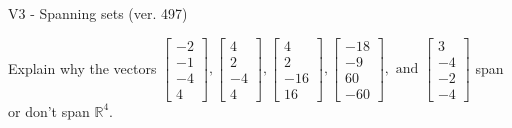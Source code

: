 \begin{exercise}
  \begin{exerciseTitle}V3 - Spanning sets (ver. 497)\end{exerciseTitle}
  \begin{exerciseStatement}
    Explain why the vectors \(\left[\begin{array}{r}
-2 \\
-1 \\
-4 \\
4
\end{array}\right] , \left[\begin{array}{r}
4 \\
2 \\
-4 \\
4
\end{array}\right] , \left[\begin{array}{r}
4 \\
2 \\
-16 \\
16
\end{array}\right] , \left[\begin{array}{r}
-18 \\
-9 \\
60 \\
-60
\end{array}\right] , \text{ and } \left[\begin{array}{r}
3 \\
-4 \\
-2 \\
-4
\end{array}\right]\) span or don't span \(\mathbb{R}^4\). 
	



\end{exerciseStatement}
\end{exercise}
